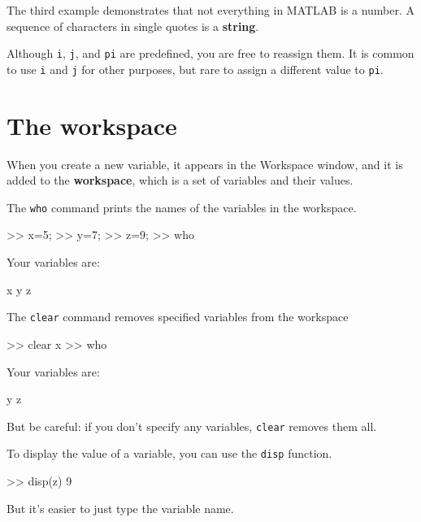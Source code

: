 \documentclass[main.tex]{subfiles}
\begin{document}

The third example demonstrates that not everything
in MATLAB is a number.
A sequence of characters in single quotes is
a {\bf string}.


Although {\tt i}, {\tt j}, and {\tt pi} are predefined, you are free
to reassign them.  It is common to use {\tt i} and {\tt j} for other
purposes, but rare to assign a different value to
{\tt pi}.



\section{The workspace}

When you create a new variable, it appears in the {\sf Workspace} window, and it is added to the {\bf workspace}, which is a
set of variables and their values.


The {\tt who} command prints the
names of the variables in the workspace.


\begin{code}
>> x=5;
>> y=7;
>> z=9;
>> who

Your variables are:

x  y  z
\end{code}

The {\tt clear} command removes specified variables from the workspace

\begin{code}
>> clear x
>> who

Your variables are:

y z
\end{code}

But be careful: if you don't specify any variables, {\tt clear} removes them all.


To display the value of a variable, you can use the {\tt disp} function.

\begin{code}
>> disp(z)
     9
\end{code}

But it's easier to just type the variable name.
\end{document}
